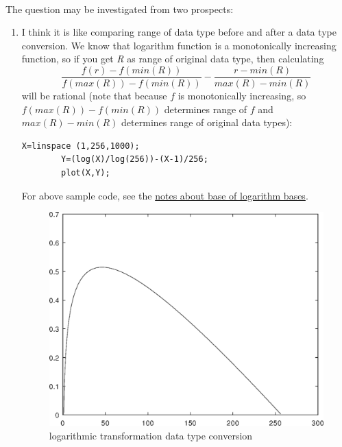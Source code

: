 \paragraph{}The question may be investigated from two prospects:
\begin{enumerate}
    \item I think it is like comparing range of data type before and after a
    data type conversion. We know that logarithm function 
    is a monotonically increasing function, so if you get \emph{R} as range of
    original data type, then calculating 
    \begin{equation*}
        \frac{f(r) - f(min(R))}{f(max(R))-f(min(R))} - \frac{r -
        min(R)}{max(R)-min(R)}  \tag{*}
    \end{equation*}\label{relation:eq_1} 
    will be rational (note that because $f$ is monotonically increasing, so $f(max(R))-f(min(R))$ determines range of $f$ and 
    $max(R)-min(R)$ determines range of original data types):
    \begin{Verbatim}[frame=single,label=Octave lab:\ logarithmic-data-type-conversion]
        X=linspace (1,256,1000);
        Y=(log(X)/log(256))-(X-1)/256;
        plot(X,Y);   
    \end{Verbatim}
    For above sample code, see the \hyperref[note:note_about_log_base]{notes
    about base of logarithm bases}.
    \begin{figure}[htb!]
        \includegraphics[scale=0.4]{logarithmic_transformation_data_type_conversion.eps}
        \centering
        \caption{logarithmic transformation data type conversion}
        \label{fig:logarithmic_transformation_data_type_conversion}
    \end{figure}
    

\end{enumerate}
